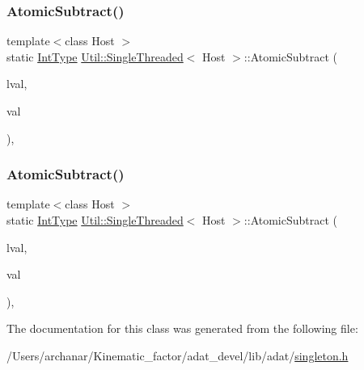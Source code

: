 \mbox{\label{classUtil_1_1SingleThreaded_a69e02798b76b46c5df8ed4cfe37ac9c5}} 
\subsubsection{\texorpdfstring{AtomicSubtract()}{AtomicSubtract()}\hspace{0.1cm}{\footnotesize\ttfamily [1/2]}}
{\footnotesize\ttfamily template$<$class Host $>$ \\
static \mbox{\hyperlink{classUtil_1_1SingleThreaded_a35932213fb0c15a7b67ced79bc2af4c6}{Int\+Type}} \mbox{\hyperlink{classUtil_1_1SingleThreaded}{Util\+::\+Single\+Threaded}}$<$ Host $>$\+::Atomic\+Subtract (\begin{DoxyParamCaption}\item[{volatile \mbox{\hyperlink{classUtil_1_1SingleThreaded_a35932213fb0c15a7b67ced79bc2af4c6}{Int\+Type}} \&}]{lval,  }\item[{\mbox{\hyperlink{classUtil_1_1SingleThreaded_a35932213fb0c15a7b67ced79bc2af4c6}{Int\+Type}}}]{val }\end{DoxyParamCaption})\hspace{0.3cm}{\ttfamily [inline]}, {\ttfamily [static]}}

\mbox{\label{classUtil_1_1SingleThreaded_a69e02798b76b46c5df8ed4cfe37ac9c5}} 
\subsubsection{\texorpdfstring{AtomicSubtract()}{AtomicSubtract()}\hspace{0.1cm}{\footnotesize\ttfamily [2/2]}}
{\footnotesize\ttfamily template$<$class Host $>$ \\
static \mbox{\hyperlink{classUtil_1_1SingleThreaded_a35932213fb0c15a7b67ced79bc2af4c6}{Int\+Type}} \mbox{\hyperlink{classUtil_1_1SingleThreaded}{Util\+::\+Single\+Threaded}}$<$ Host $>$\+::Atomic\+Subtract (\begin{DoxyParamCaption}\item[{volatile \mbox{\hyperlink{classUtil_1_1SingleThreaded_a35932213fb0c15a7b67ced79bc2af4c6}{Int\+Type}} \&}]{lval,  }\item[{\mbox{\hyperlink{classUtil_1_1SingleThreaded_a35932213fb0c15a7b67ced79bc2af4c6}{Int\+Type}}}]{val }\end{DoxyParamCaption})\hspace{0.3cm}{\ttfamily [inline]}, {\ttfamily [static]}}



The documentation for this class was generated from the following file\+:\begin{DoxyCompactItemize}
\item 
/\+Users/archanar/\+Kinematic\+\_\+factor/adat\+\_\+devel/lib/adat/\mbox{\hyperlink{lib_2adat_2singleton_8h}{singleton.\+h}}\end{DoxyCompactItemize}
